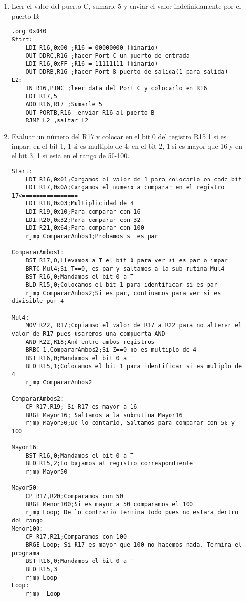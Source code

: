 \documentclass[
	12pt, %
	fleqn, %
	a4paper, %
]{LegrandOrangeBook}
\begin{document}
\begin{enumerate}
\item Leer el valor del puerto C, sumarle 5 y enviar el valor indefinidamente por el puerto B:
\begin{lstlisting}[language={[x86masm]Assembler},frame=single,caption={Leer el valor del puerto C y sumar},captionpos=b,numbers=none]
.org 0x040
Start:
	LDI R16,0x00 ;R16 = 00000000 (binario)
	OUT DDRC,R16 ;hacer Port C un puerto de entrada
	LDI R16,0xFF ;R16 = 11111111 (binario)
	OUT DDRB,R16 ;hacer Port B puerto de salida(1 para salida)
L2: 
	IN R16,PINC ;leer data del Port C y colocarlo en R16
	LDI R17,5
	ADD R16,R17 ;Sumarle 5
	OUT PORTB,R16 ;enviar R16 al puerto B
	RJMP L2 ;saltar L2
\end{lstlisting}
\item Evaluar un número del R17 y colocar en el bit 0 del registro R15 1 si es impar; en el bit 1, 1 si es multiplo de 4; en el bit 2, 1 si es mayor que 16 y en el bit 3, 1 si esta en el rango de 50-100.
\begin{lstlisting}[language={[x86masm]Assembler},frame=single,caption={Set los bits desde el 0 al 3 si cumple ciertas condiciones},captionpos=b,numbers=none]
Start:
	LDI R16,0x01;Cargamos el valor de 1 para colocarlo en cada bit
	LDI R17,0x0A;Cargamos el numero a comparar en el registro 17<================
	LDI R18,0x03;Multiplicidad de 4
	LDI R19,0x10;Para comparar con 16
	LDI R20,0x32;Para comparar con 32
	LDI R21,0x64;Para comparar con 100
	rjmp CompararAmbos1;Probamos si es par

CompararAmbos1:
	BST R17,0;Llevamos a T el bit 0 para ver si es par o impar
	BRTC Mul4;Si T==0, es par y saltamos a la sub rutina Mul4
	BST R16,0;Mandamos el bit 0 a T
	BLD R15,0;Colocamos el bit 1 para identificar si es par
	rjmp CompararAmbos2;Si es par, contiuamos para ver si es divisible por 4

Mul4:
	MOV R22, R17;Copiamso el valor de R17 a R22 para no alterar el valor de R17 pues usaremos una compuerta AND
	AND R22,R18;And entre ambos registros
	BRBC 1,CompararAmbos2;Si Z==0 no es multiplo de 4
	BST R16,0;Mandamos el bit 0 a T
	BLD R15,1;Colocamos el bit 1 para identificar si es muliplo de 4
	rjmp CompararAmbos2

CompararAmbos2:
	CP R17,R19; Si R17 es mayor a 16
	BRGE Mayor16; Saltamos a la subrutina Mayor16
	rjmp Mayor50;De lo contario, Saltamos para comparar con 50 y 100
	
Mayor16:
	BST R16,0;Mandamos el bit 0 a T
	BLD R15,2;Lo bajamos al registro correspondiente
	rjmp Mayor50

Mayor50:
	CP R17,R20;Comparamos con 50
	BRGE Menor100;Si es mayor a 50 comparamos el 100
	rjmp Loop; De lo contrario termina todo pues no estara dentro del rango
Menor100:
	CP R17,R21;Comparamos con 100
	BRGE Loop; Si R17 es mayor que 100 no hacemos nada. Termina el programa
	BST R16,0;Mandamos el bit 0 a T
	BLD R15,3
	rjmp Loop
Loop:    
    rjmp  Loop
\end{lstlisting}
\end{enumerate}
\end{document}
